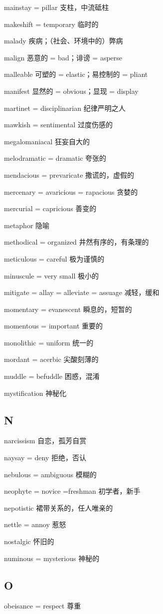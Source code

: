 \documentclass[UTF8, fontset = none, zihao = -4, linespread = 1.1]{ctexart}
\begin{document}
\begin{multicols}{2}
mainstay = pillar 支柱，中流砥柱

makeshift = temporary 临时的

malady 疾病；（社会、环境中的）弊病

malign 恶意的 = bad；诽谤 = asperse

malleable 可塑的 = elastic；易控制的 = pliant

manifest 显然的 = obvious；显现 = display

martinet = disciplinarian 纪律严明之人

mawkish = sentimental 过度伤感的

megalomaniacal 狂妄自大的

melodramatic = dramatic 夸张的

mendacious = prevaricate 撒谎的，虚假的

mercenary = avaricious = rapacious 贪婪的

mercurial = capricious 善变的

metaphor 隐喻

methodical = organized 井然有序的，有条理的

meticulous = careful 极为谨慎的

minuscule = very small 极小的

mitigate = allay = alleviate = assuage 减轻，缓和

momentary = evanescent 瞬息的，短暂的

momentous = important 重要的

monolithic = uniform 统一的

mordant = acerbic 尖酸刻薄的

muddle = befuddle 困惑，混淆

mystification 神秘化

\subsection*{N}
narcissism 自恋，孤芳自赏

naysay = deny 拒绝，否认

nebulous = ambiguous 模糊的

neophyte = novice =freshman 初学者，新手

nepotistic 裙带关系的，任人唯亲的

nettle = annoy 惹怒

nostalgic 怀旧的

numinous = mysterious 神秘的

\subsection*{O}
obeisance = respect 尊重


\end{multicols}
\end{document}
